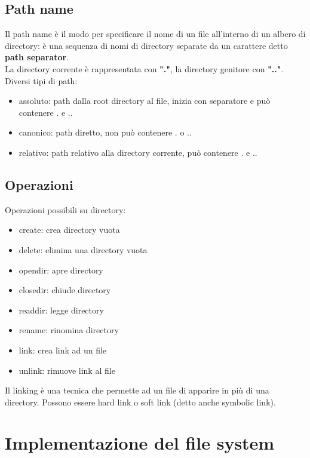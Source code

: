 \documentclass[12pt]{article}
\begin{document}
\subsection{Path name}
Il path name è il modo per specificare il nome di un file all'interno di un albero di directory: è una sequenza di 
nomi di directory separate da un carattere detto \textbf{path separator}.\\
La directory corrente è rappresentata con \textbf{"."}, la directory genitore con \textbf{".."}.\\
Diversi tipi di path:
\begin{itemize}
    \item assoluto: path dalla root directory al file, inizia con separatore e può contenere . e ..
    \item canonico: path diretto, non può contenere . o ..
    \item relativo: path relativo alla directory corrente, può contenere . e ..
\end{itemize}
\subsection{Operazioni}
Operazioni possibili su directory:
\begin{itemize}
    \item create: crea directory vuota
    \item delete: elimina una directory vuota
    \item opendir: apre directory
    \item closedir: chiude directory
    \item readdir: legge directory
    \item rename: rinomina directory
    \item link: crea link ad un file
    \item unlink: rimuove link al file
\end{itemize}
Il linking è una tecnica che permette ad un file di apparire in più di una directory. Possono essere hard link o
soft link (detto anche symbolic link).
\section{Implementazione del file system}
\end{document}
